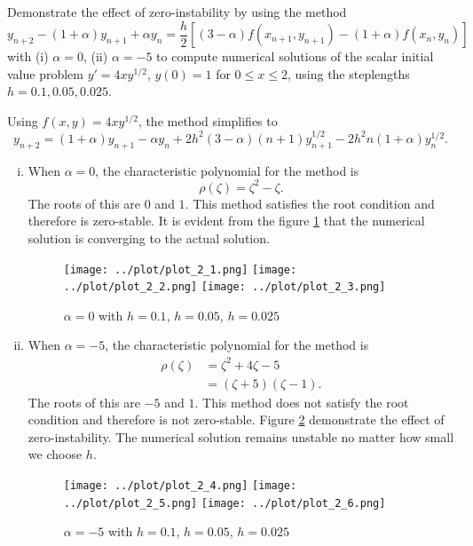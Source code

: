 \begin{problem}[L 2.5.4]
  Demonstrate the effect of zero-instability by using the method
  \[
    y_{n + 2} - (1 + \alpha)y_{n + 1} + \alpha y_n = \frac{h}{2}\left[(3-\alpha) f(x_{n+1}, y_{n+1}) - (1 + \alpha) f(x_n, y_n)\right]
  \]
  with (i) $\alpha = 0$, (ii) $\alpha = -5$ to compute numerical solutions of the scalar initial value problem $y' = 4xy^{1/2}$, $y(0) = 1$ for $0 \leq x \leq 2$, using the steplengths $h = 0.1, 0.05, 0.025$.
\end{problem}

\begin{solution}
  Using $f(x, y) = 4xy^{1/2}$, the method simplifies to
  \[
    y_{n+2} = (1 + \alpha) y_{n+1} - \alpha y_n + 2 h^2 (3-\alpha) (n+1) y_{n+1}^{1/2} - 2 h^2 n (1 + \alpha) y_n^{1/2}.
  \]
  \begin{enumerate}[(i)]
    \item 
    When $\alpha = 0$, the characteristic polynomial for the method is
    \[
      \rho(\zeta) = \zeta^2 - \zeta.
    \]
    The roots of this are $0$ and $1$. This method satisfies the root condition and therefore is zero-stable. It is evident from the figure \ref{fig:prob2_1} that the numerical solution is converging to the actual solution.
    \begin{figure}[!ht]
      \centering
      \texttt{[image: ../plot/plot\_2\_1.png]}
      \texttt{[image: ../plot/plot\_2\_2.png]}
      \texttt{[image: ../plot/plot\_2\_3.png]}
      \caption{$\alpha = 0$ with $h = 0.1$, $h = 0.05$, $h = 0.025$}
      \label{fig:prob2_1}
    \end{figure}
    \FloatBarrier
    \item
    When $\alpha = -5$, the characteristic polynomial for the method is
    \begin{align*}
      \rho(\zeta) 
      &= \zeta^2 + 4\zeta - 5 \\
      &= (\zeta + 5)(\zeta - 1).
    \end{align*}
    The roots of this are $-5$ and $1$. This method does not satisfy the root condition and therefore is not zero-stable. Figure \ref{fig:prob2_2} demonstrate the effect of zero-instability. The numerical solution remains unstable no matter how small we choose $h$.
    \begin{figure}[!ht]
      \centering
      \texttt{[image: ../plot/plot\_2\_4.png]}
      \texttt{[image: ../plot/plot\_2\_5.png]}
      \texttt{[image: ../plot/plot\_2\_6.png]}
      \caption{$\alpha = -5$ with $h = 0.1$, $h = 0.05$, $h = 0.025$}
      \label{fig:prob2_2}
    \end{figure}
  \end{enumerate}
\end{solution}
